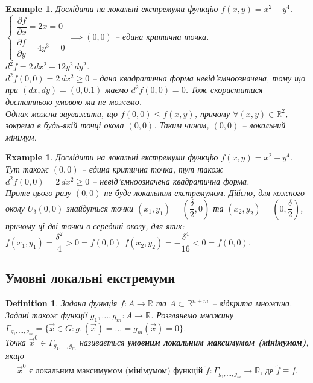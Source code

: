 \documentclass[a4paper, 10pt]{article}
\def\departial#1#2{\dfrac{\partial {#1}}{\partial {#2}}}
\theoremstyle{theoremdd}
\theoremstyle{theoremdd}
\theoremstyle{theoremdd}
\newtheorem{definition}[theorem]{Definition}
\theoremstyle{theoremdd}
\theoremstyle{theoremdd}
\newtheorem{example}[theorem]{Example}
\theoremstyle{theoremdd}
\theoremstyle{theoremdd}
\theoremstyle{theoremdd}
\theoremstyle{theoremdd}
\begin{document}
\begin{example}
Дослідити на локальні екстремуми функцію $f(x,y) = x^2+y^4$.\\
$\begin{cases} \departial{f}{x} = 2x = 0 \\ \departial{f}{y} = 4y^3 = 0 \end{cases} \implies (0,0)$ -- єдина критична точка.\\
$d^2 f = 2\,dx^2 + 12y^2\,dy^2$.\\
$d^2 f(0,0) = 2\,dx^2 \geq 0$ -- дана квадратична форма невід'ємноозначена, тому що при $(dx,dy) = (0,0.1)$ маємо $d^2 f(0,0) = 0$. Тож скористатися достатньою умовою ми не можемо.\\
Однак можна зауважити, що $f(0,0) \leq f(x,y)$, причому $\forall (x,y) \in \mathbb{R}^2$, зокрема в будь-якій точці окола $(0,0)$. Таким чином, $(0,0)$ -- локальний мінімум.
\end{example}

\begin{example}
Дослідити на локальні екстремуми функцію $f(x,y) = x^2-y^4$.\\
Тут також $(0,0)$ -- єдина критична точка, тут також $d^2 f(0,0) = 2\,dx^2 \geq 0$ -- невід'ємноозначена квадратична форма.\\
Проте цього разу $(0,0)$ не буде локальним екстремумом. Дійсно, для кожного околу $U_\delta (0,0)$ знайдуться точки $(x_1,y_1) = \left(\dfrac{\delta}{2}, 0 \right)$ та $(x_2,y_2) = \left(0, \dfrac{\delta}{2} \right)$, причому ці дві точки в середині околу, для яких:\\
$f(x_1,y_1) = \dfrac{\delta^2}{4} > 0 = f(0,0)$ \hspace{2cm} $f(x_2,y_2) = - \dfrac{\delta^4}{16} < 0 = f(0,0)$.
\end{example}

\subsection{Умовні локальні екстремуми}
\begin{definition}
Задана функція $f\colon A \to \mathbb{R}$ та $A \subset \mathbb{R}^{n+m}$ -- відкрита множина. Задані також функції $g_1,\dots,g_m \colon A \to \mathbb{R}$. Розглянемо множину $\Gamma_{g_1,\dots,g_m} = \{ \vec{x} \in G: g_1(\vec{x}) = \dots = g_m(\vec{x}) = 0 \}$.\\
Точка $\vec{x}^0 \in \Gamma_{g_1,\dots,g_m}$ називається \textbf{умовним локальним максимумом (мінімумом)}, якщо
\begin{align*}
\text{$\vec{x}^0$ є локальним максимумом (мінімумом) функцій $\tilde{f} \colon \Gamma_{g_1,\dots,g_m} \to \mathbb{R}$, де $\tilde{f} \equiv f$.}
\end{align*}
\end{definition}
\end{document}
